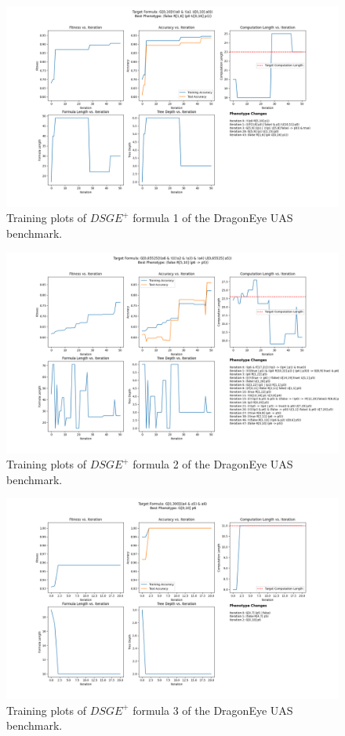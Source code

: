 \documentclass[runningheads]{llncs}
\begin{document}
\begin{figure}
    \centering
    \includegraphics[width=1.1\textwidth]{figs/log_fmsd17_formula1.txt.png}
    \caption{Training plots of $DSGE^+$ formula 1 of the DragonEye UAS benchmark.}
    \label{fig:fmsd17_formula1} 
\end{figure}   

\begin{figure}
    \centering
    \includegraphics[width=1.1\textwidth]{figs/log_fmsd17_formula2.txt.png}
    \caption{Training plots of $DSGE^+$ formula 2 of the DragonEye UAS benchmark.}
    \label{fig:fmsd17_formula2}
\end{figure}

\begin{figure}
    \centering
    \includegraphics[width=1.1\textwidth]{figs/log_fmsd17_formula3.txt.png}
    \caption{Training plots of $DSGE^+$ formula 3 of the DragonEye UAS benchmark.}
    \label{fig:fmsd17_formula3}
\end{figure}
\end{document}
